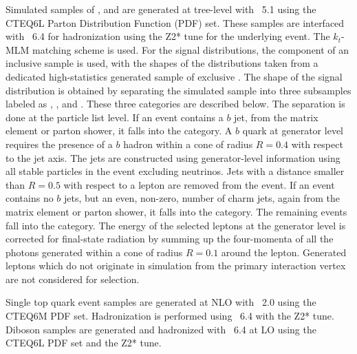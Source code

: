 Simulated samples of \vjets, \gjets
 and  \ttjets are generated at tree-level with
 \textsc{\MADGRAPH~5.1} \cite {Alwall:2011uj,ref:MadEvent} %
 using the CTEQ6L \cite {ref:CTEQ66} Parton Distribution Function (PDF) set.
These samples are interfaced with
 \textsc{\PYTHIA~6.4} \cite {Sjostrand:2006za} for
 hadronization using the Z2* tune for the underlying event.
The $k_t$-MLM \cite {Alwall:2007fs,Alwall:2008qv} matching scheme is used.
For the signal distributions, the \wbb component of
 an inclusive \wjets sample is used,
 with the shapes of the distributions taken
 from a dedicated high-statistics generated sample of exclusive \wbb.
The shape of the \wbb signal distribution is obtained by separating
 the \wjets simulated sample into three subsamples labeled as \wbb, \wcc, and \wudscg.
These three categories are described below.
The separation is done at the particle list level.
If an event contains a $b$ jet, from the matrix element or parton shower,
 it falls into the \wbb category.
A $b$ quark at generator level requires
 the presence of a $b$ hadron within a cone of
 radius $R=0.4$ with respect to the jet axis.
The jets are constructed using generator-level information using
 all stable particles in the event excluding neutrinos.
Jets with a distance smaller than $R = 0.5$ with respect to a
 lepton are removed from the event.
If an event contains no $b$ jets, but
 an even, non-zero, number of charm jets,
 again from the matrix element or
 parton shower, it falls into the \wcc category.
The remaining events fall into the \wudscg category.
The energy of the selected leptons at the generator level is corrected
 for final-state radiation by summing up
 the four-momenta of
 all the photons generated within a cone of radius $R = 0.1$
 around the lepton.
Generated leptons which do not originate in simulation
 from the primary interaction vertex are not considered for selection.

Single top quark event samples are generated at NLO with
 \textsc{\POWHEG~2.0}
  \cite {Nason:2004rx,Frixione:2007vw,ref:POWHEG_T_SandTchannel,ref:POWHEG_T_tWchannel}
 using the CTEQ6M PDF set.
Hadronization is performed using
 \textsc{\PYTHIA~6.4} with the Z2* tune.
Diboson samples are generated and hadronized
 with \textsc{\PYTHIA~6.4} at LO
 using the CTEQ6L PDF set and the Z2* tune.

